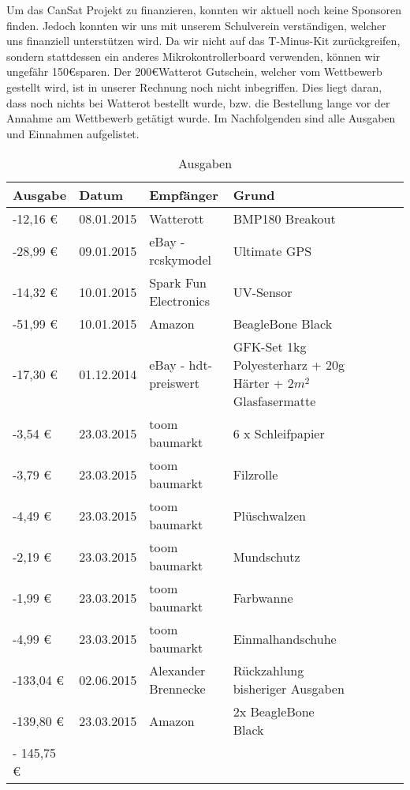 Um das CanSat Projekt zu finanzieren, konnten wir aktuell noch keine Sponsoren finden. Jedoch konnten wir uns mit unserem Schulverein verständigen, welcher uns finanziell unterstützen wird. Da wir nicht auf das T-Minus-Kit zurückgreifen, sondern stattdessen ein anderes Mikrokontrollerboard verwenden, können wir ungefähr 150\euro  sparen. Der 200\euro  Watterot Gutschein, welcher vom Wettbewerb gestellt wird, ist in unserer Rechnung noch nicht inbegriffen. Dies liegt daran, dass noch nichts bei Watterot bestellt wurde, bzw. die Bestellung lange vor der Annahme am Wettbewerb getätigt wurde.
Im Nachfolgenden sind alle Ausgaben und Einnahmen aufgelistet.
\begin{table}[H]
  \centering
    \begin{tabular}{p{}p{}p{}p{}rrrl}
    \toprule
    \textbf{Ausgabe} & \textbf{Datum} & \textbf{Empfänger} & \textbf{Grund} \\
    \midrule
    -12,16 \euro  & 08.01.2015 & Watterott & BMP180 Breakout \\
    -28,99 \euro  & 09.01.2015 & eBay - rcskymodel & Ultimate GPS \\
    -14,32 \euro  & 10.01.2015 & Spark Fun Electronics & UV-Sensor \\
    -51,99 \euro  & 10.01.2015 & Amazon & BeagleBone Black \\
    -17,30 \euro  & 01.12.2014 & eBay - hdt-preiswert & 
GFK-Set 1kg Polyesterharz + 20g Härter + $2m^2$ Glasfasermatte \\
    -3,54 \euro  & 23.03.2015 & toom baumarkt & 6 x Schleifpapier \\
    -3,79 \euro  & 23.03.2015 & toom baumarkt & Filzrolle \\
    -4,49 \euro  & 23.03.2015 & toom baumarkt & Plüschwalzen \\
    -2,19 \euro  & 23.03.2015 & toom baumarkt & Mundschutz \\
    -1,99 \euro  & 23.03.2015 & toom baumarkt & Farbwanne \\
    -4,99 \euro  & 23.03.2015 & toom baumarkt & Einmalhandschuhe \\
    -133,04 \euro  & 02.06.2015 & Alexander Brennecke& Rückzahlung bisheriger Ausgaben\\
	-139,80 \euro  & 23.03.2015 & Amazon & 2x BeagleBone Black\\
    \bottomrule
    - 145,75 \euro & & & \\
    \bottomrule
    \end{tabular}%
    \caption{Ausgaben}
  \label{tab:budgetausgaben}%
\end{table}%

